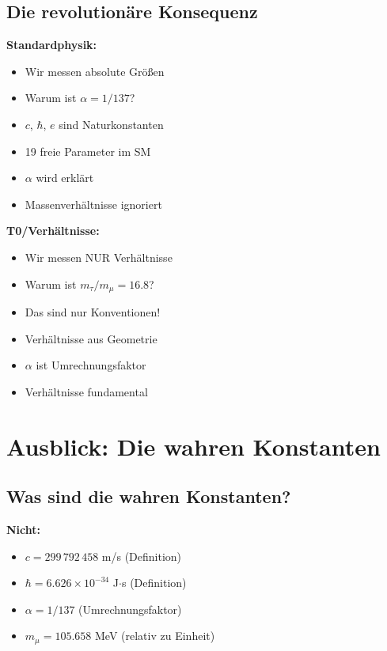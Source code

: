 \subsection{Die revolutionäre Konsequenz}

\vspace{0.5cm}
\noindent
\begin{minipage}[t]{0.48\textwidth}
	\textbf{Standardphysik:}
	\begin{itemize}[nosep]
		\item Wir messen absolute Größen
		\item Warum ist $\alpha = 1/137$?
		\item $c$, $\hbar$, $e$ sind Naturkonstanten
		\item 19 freie Parameter im SM
		\item $\alpha$ wird erklärt
		\item Massenverhältnisse ignoriert
	\end{itemize}
\end{minipage}
\hfill
\begin{minipage}[t]{0.48\textwidth}
	\textbf{T0/Verhältnisse:}
	\begin{itemize}[nosep]
		\item Wir messen NUR Verhältnisse
		\item Warum ist $m_\tau/m_\mu = 16.8$?
		\item Das sind nur Konventionen!
		\item Verhältnisse aus Geometrie
		\item $\alpha$ ist Umrechnungsfaktor
		\item Verhältnisse fundamental
	\end{itemize}
\end{minipage}
\vspace{0.5cm}

\section{Ausblick: Die wahren Konstanten}

\subsection{Was sind die wahren Konstanten?}

\textbf{Nicht:}
\begin{itemize}[nosep]
	\item $c = 299\,792\,458$ m/s (Definition)
	\item $\hbar = 6.626 \times 10^{-34}$ J$\cdot$s (Definition)
	\item $\alpha = 1/137$ (Umrechnungsfaktor)
	\item $m_\mu = 105.658$ MeV (relativ zu Einheit)
\end{itemize}

